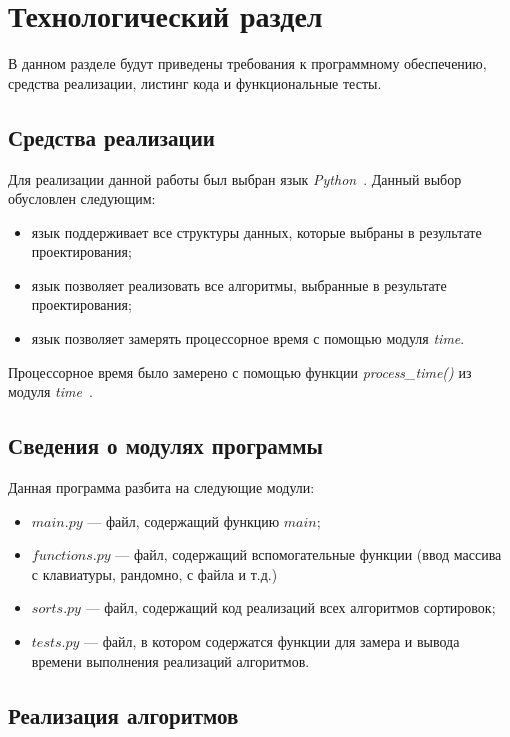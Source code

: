 \chapter{Технологический раздел}

В данном разделе будут приведены требования к программному обеспечению, средства реализации, листинг кода и функциональные тесты.

\section{Средства реализации}

Для реализации данной работы был выбран язык \textit{Python}~\cite{python}.
Данный выбор обусловлен следующим:
\begin{itemize}
	\item язык поддерживает все структуры данных, которые выбраны в результате проектирования;
	\item язык позволяет реализовать все алгоритмы, выбранные в результате проектирования;
	\item язык позволяет замерять процессорное время с помощью модуля \textit{time}. 
\end{itemize}

Процессорное время было замерено с помощью функции \textit{process\_time()} из модуля \textit{time}~\cite{python-time}.

\section{Сведения о модулях программы}

Данная программа разбита на следующие модули:
\begin{itemize}
	\item $main.py$ --- файл, содержащий функцию $main$;
	\item $functions.py$ --- файл, содержащий вспомогательные функции (ввод массива с клавиатуры, рандомно, с файла и т.д.)
	\item $sorts.py$ --- файл, содержащий код реализаций всех алгоритмов сортировок;
	\item $tests.py$ --- файл, в котором содержатся функции для замера и вывода времени выполнения реализаций алгоритмов.
\end{itemize}

\section{Реализация алгоритмов}

